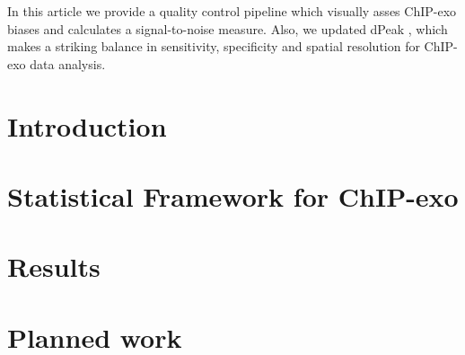 \documentclass[11pt]{article}\usepackage[]{graphicx}\usepackage[]{color}
\begin{document}
    In this article we provide a quality control pipeline which
    visually asses ChIP-exo biases and calculates a signal-to-noise
    measure. Also, we updated dPeak \cite{dpeak}, which makes a
    striking balance in sensitivity, specificity and spatial
    resolution for ChIP-exo data analysis.


\section{Introduction}
\label{sec:intro}

\section{Statistical Framework for ChIP-exo}
\label{sec:stat}



\section{Results}
\label{sec:results}



\section{Planned work}
\label{sec:future}





\newpage


\end{document}

